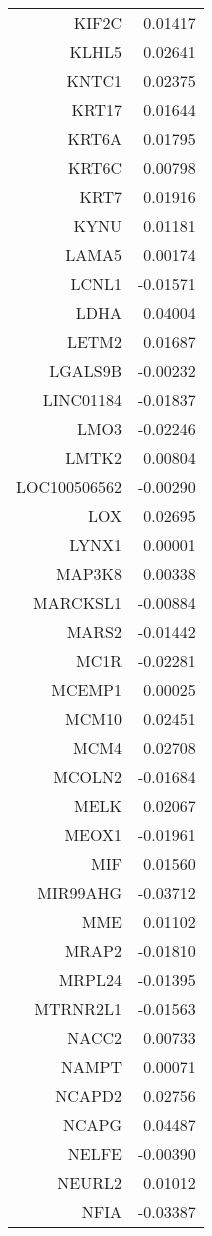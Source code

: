 \begin{longtable}{rr}
  KIF2C & 0.01417 \\ 
  KLHL5 & 0.02641 \\ 
  KNTC1 & 0.02375 \\ 
  KRT17 & 0.01644 \\ 
  KRT6A & 0.01795 \\ 
  KRT6C & 0.00798 \\ 
  KRT7 & 0.01916 \\ 
  KYNU & 0.01181 \\ 
  LAMA5 & 0.00174 \\ 
  LCNL1 & -0.01571 \\ 
  LDHA & 0.04004 \\ 
  LETM2 & 0.01687 \\ 
  LGALS9B & -0.00232 \\ 
  LINC01184 & -0.01837 \\ 
  LMO3 & -0.02246 \\ 
  LMTK2 & 0.00804 \\ 
  LOC100506562 & -0.00290 \\ 
  LOX & 0.02695 \\ 
  LYNX1 & 0.00001 \\ 
  MAP3K8 & 0.00338 \\ 
  MARCKSL1 & -0.00884 \\ 
  MARS2 & -0.01442 \\ 
  MC1R & -0.02281 \\ 
  MCEMP1 & 0.00025 \\ 
  MCM10 & 0.02451 \\ 
  MCM4 & 0.02708 \\ 
  MCOLN2 & -0.01684 \\ 
  MELK & 0.02067 \\ 
  MEOX1 & -0.01961 \\ 
  MIF & 0.01560 \\ 
  MIR99AHG & -0.03712 \\ 
  MME & 0.01102 \\ 
  MRAP2 & -0.01810 \\ 
  MRPL24 & -0.01395 \\ 
  MTRNR2L1 & -0.01563 \\ 
  NACC2 & 0.00733 \\ 
  NAMPT & 0.00071 \\ 
  NCAPD2 & 0.02756 \\ 
  NCAPG & 0.04487 \\ 
  NELFE & -0.00390 \\ 
  NEURL2 & 0.01012 \\ 
  NFIA & -0.03387 \\ 

\end{longtable}
